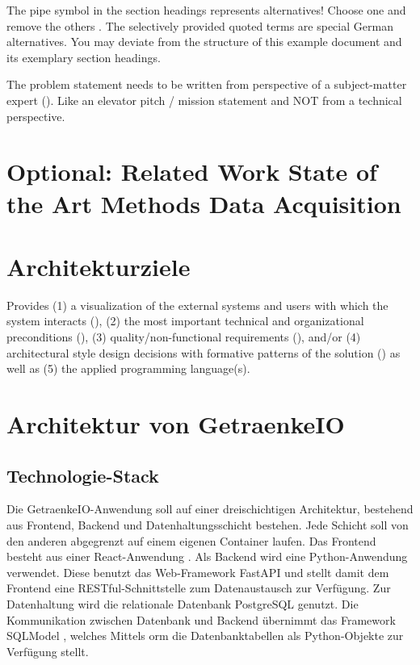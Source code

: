 \documentclass[conference,a4paper]{cs-techrep}
\begin{document}
The pipe symbol \textquote{\textbar{}} in the section headings represents alternatives! Choose one and remove the others \faWarning{}. The selectively provided quoted terms are special German alternatives. You may deviate from the structure of this example document and its exemplary section headings.

The problem statement needs to be written from perspective of a subject-matter expert (). Like an elevator pitch / mission statement \faWarning{} and NOT from a technical perspective.

\section{Optional: Related Work \textbar{} State of the Art \textbar{} Methods \textbar{} Data Acquisition}
\lipsum[2]

\section{Architekturziele} %
Provides
(1) a visualization of the external systems and users with which the system interacts (),
(2) the most important technical and organizational preconditions (),
(3) quality/non-functional requirements (), and/or
(4) architectural style design decisions with formative patterns of the solution ()
as well as (5) the applied programming language(s).

\section{Architektur von GetraenkeIO} %

\subsection{Technologie-Stack} %
Die GetraenkeIO-Anwendung soll auf einer dreischichtigen Architektur, bestehend aus Frontend, Backend und Datenhaltungsschicht bestehen.
Jede Schicht soll von den anderen abgegrenzt auf einem eigenen Container \cite{conatiners} laufen.
Das Frontend besteht aus einer React-Anwendung \cite{react}.
Als Backend wird eine Python-Anwendung \cite{python} verwendet.
Diese benutzt das Web-Framework FastAPI \cite{fastapi} und stellt damit dem Frontend eine RESTful-Schnittstelle \cite{restful} zum Datenaustausch zur Verfügung.
Zur Datenhaltung wird die relationale Datenbank PostgreSQL \cite{postgresql} genutzt.
Die Kommunikation zwischen Datenbank und Backend übernimmt das Framework SQLModel \cite{sqlmodel}, welches Mittels \ac{orm} die Datenbanktabellen als Python-Objekte zur Verfügung stellt.
\end{document}
